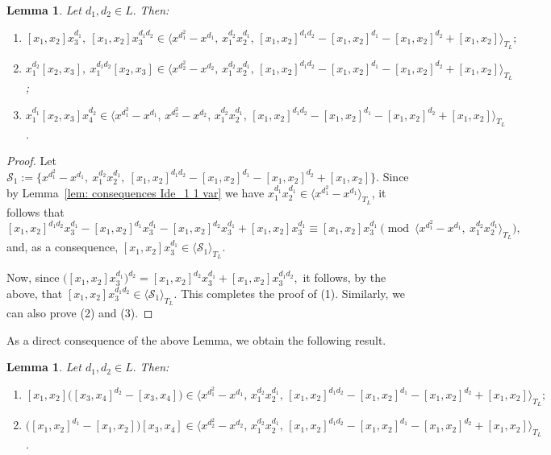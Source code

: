 \documentclass[a4paper,reqno]{amsart}
\newtheorem{lemma}[theorem]{Lemma}
\theoremstyle{definition}
\numberwithin{equation}{section}
\numberwithin{theorem}{section}
\newcommand{\black}{\color{black}}
\begin{document}
\begin{lemma}\label{lem: UT_3^e1,e2 d1 d2 com}
    Let $d_1,d_2\in L.$
Then:
\begin{enumerate}
    \item $[x_1,x_2]x_3^{d_1}, \ [x_1,x_2]x_3^{d_1 d_2}\in \langle x^{d_1^2}-x^{d_1},\, x_1^{d_2}x_2^{d_1},\,  [x_1,x_2]^{d_1 d_2}-[x_1,x_2]^{d_1} - [x_1,x_2]^{d_2}+[x_1,x_2]\rangle_{T_L};$
    \vspace{1mm}
    \item $x_1^{d_2}[x_2,x_3], \  x_1^{d_1 d_2}[x_2,x_3]  \in \langle x^{d_2^2}-x^{d_2},\, x_1^{d_2}x_2^{d_1}, \,  [x_1,x_2]^{d_1 d_2}- [x_1,x_2]^{d_1} - [x_1,x_2]^{d_2}+ [x_1,x_2] \rangle_{T_L}$;
    \vspace{1mm}
    \item $x_1^{d_1}[x_2,x_3]x_4^{d_2}\in \langle x^{d_1^2}-x^{d_1},\, x^{d_2^2}-x^{d_2},\,  x_1^{d_2}x_2^{d_1} ,\,  [x_1,x_2]^{d_1 d_2}-[x_1,x_2]^{d_1} - [x_1,x_2]^{d_2}+ [x_1,x_2] \rangle_{T_L}$.
\end{enumerate}
\end{lemma}
\begin{proof}\black
Let $\mathcal{S}_1:=\{ x^{d_1^2}-x^{d_1},\ x_1^{d_2}x_2^{d_1},\   [x_1,x_2]^{d_1 d_2}-[x_1,x_2]^{d_1} - [x_1,x_2]^{d_2}+ [x_1,x_2] \}.$
    Since by Lemma~\ref{lem: consequences Ide_1 1 var} we have $x_1^{d_1}x_2^{d_1}\in \langle x^{d_1^2}-x^{d_1} \rangle_{T_L} $, it follows that
 $$
    [x_1,x_2]^{d_1 d_2}x_3^{d_1}- [x_1,x_2]^{d_1}x_3^{d_1} -[x_1,x_2]^{d_2}x_3^{d_1} + [x_1,x_2]x_3^{d_1}\equiv [x_1,x_2]x_3^{d_1}\pmod{\langle x^{d_1^2}-x^{d_1},\ x_1^{d_2} x_2^{d_1} \rangle_{T_L}},
     $$
and, as a consequence, $[x_1,x_2]x_3^{d_1}\in \langle \mathcal{S}_1 \rangle_{T_L}.$

Now, since $\big([x_1,x_2]x_3^{d_1}\big)^{d_2}=[x_1,x_2]^{d_2}x_3^{d_1} + [x_1,x_2]x_3^{d_1 d_2},$ it follows, by the above, that $[x_1,x_2]x_3^{d_1 d_2}\in \langle\mathcal{S}_1\rangle_{T_L}.$ This completes the proof of (1). Similarly, we can also prove (2) and (3).
\end{proof}

As a direct consequence of the above Lemma, we obtain the following result.
\begin{lemma}\label{lem: UT_3^e1,e2 comm ordin}
    Let $d_1,d_2\in L.$
Then:
\begin{enumerate}
    \item$[x_1,x_2] \big([x_3,x_4]^{d_2}-[x_3,x_4]\big)\in \langle x^{d_1^2}-x^{d_1},\, x_1^{d_2}x_2^{d_1}, \,  [x_1,x_2]^{d_1 d_2}- [x_1,x_2]^{d_1} - [x_1,x_2]^{d_2}+ [x_1,x_2]\rangle_{T_L};$
    \vspace{1mm}
    \item $\big([x_1,x_2]^{d_1}-[x_1,x_2]\big)[x_3,x_4] \in \langle x^{d_2^2}-x^{d_2},\, x_1^{d_2}x_2^{d_1}, \,   [x_1,x_2]^{d_1 d_2}- [x_1,x_2]^{d_1} - [x_1,x_2]^{d_2}+ [x_1,x_2] \rangle_{T_L}$.
\end{enumerate}
\end{lemma}
\end{document}
